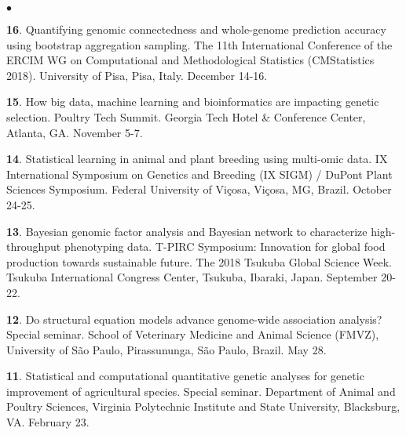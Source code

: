 \documentclass[margin,line,10pt]{res}
\newenvironment{list2}{
  \begin{list}{$\bullet$}{%
      \setlength{\itemsep}{0in}
      \setlength{\parsep}{0in} \setlength{\parskip}{0in}
      \setlength{\topsep}{0in} \setlength{\partopsep}{0in} 
      \setlength{\leftmargin}{0.2in}}}{\end{list}}
\begin{document}
\begin{resume}
\begin{list2}
    \vspace{0.5cm}
    
   \item [{\bf 16}.] Quantifying genomic connectedness and whole-genome prediction accuracy using bootstrap aggregation sampling. The 11th International Conference of the ERCIM WG on Computational and Methodological Statistics (CMStatistics 2018). University of Pisa, Pisa, Italy. December 14-16.

     \vspace{0.5cm}
     
    \item [{\bf 15}.] How big data, machine learning and bioinformatics are impacting genetic selection. Poultry Tech Summit. Georgia Tech Hotel \& Conference Center, Atlanta, GA. November 5-7.

      \vspace{0.5cm}
      
  \item [{\bf 14}.] Statistical learning in animal and plant breeding using multi-omic data. IX International Symposium on Genetics and Breeding (IX SIGM) / DuPont Plant Sciences Symposium.  Federal University of Vi\c cosa, Vi\c cosa, MG, Brazil. October 24-25.
  
  
  \vspace{0.5cm}
  
\item [{\bf 13}.] Bayesian genomic factor analysis and Bayesian network to characterize high-throughput phenotyping data. T-PIRC Symposium: Innovation for global food production towards sustainable future. The 2018 Tsukuba Global Science Week. Tsukuba International Congress Center, Tsukuba, Ibaraki, Japan. September 20-22.
  

  \vspace{0.5cm}
  
  
\item [{\bf 12}.] Do structural equation models advance genome-wide association analysis? Special seminar. School of Veterinary Medicine and Animal Science (FMVZ), University of S\~{a}o Paulo, Pirassununga, S\~{a}o Paulo, Brazil.  May 28.

    \vspace{0.5cm}
    
\item [{\bf 11}.]  Statistical and computational quantitative genetic analyses for genetic improvement of agricultural species. Special seminar.  Department of Animal and Poultry Sciences, Virginia Polytechnic Institute and State University, Blacksburg, VA. February 23.


\end{list2}
\end{resume}
\end{document}
